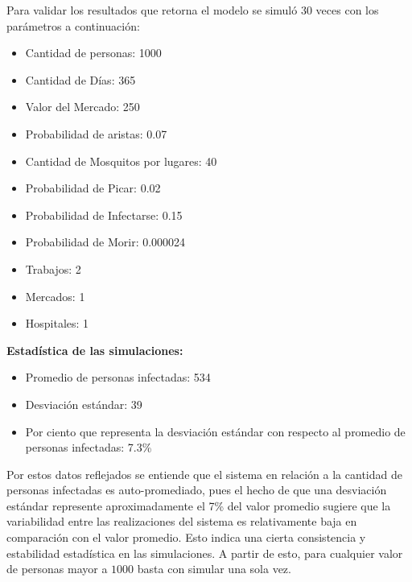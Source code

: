 Para validar los resultados que retorna el modelo se simuló $30$ veces con los parámetros a continuación:
\begin{itemize}
    \item Cantidad de personas: 1000
    \item Cantidad de Días: 365
    \item Valor del Mercado: 250
    \item Probabilidad de aristas: 0.07
    \item Cantidad de Mosquitos por lugares: 40
    \item Probabilidad de Picar: 0.02
    \item Probabilidad de Infectarse: 0.15
    \item Probabilidad de Morir: 0.000024
    \item Trabajos: 2
    \item Mercados: 1
    \item Hospitales: 1
\end{itemize}
\vspace{0.50cm}

\textbf{Estadística de las simulaciones:}
\begin{itemize}
    \item Promedio de personas infectadas: 534
    \item Desviación estándar: 39
    \item Por ciento que representa la desviación estándar con respecto al promedio de personas infectadas: 7.3\%
\end{itemize}

Por estos datos reflejados se entiende que el sistema en relación
a la cantidad de personas infectadas es auto-promediado, pues el hecho de que una desviación estándar represente aproximadamente el 7\% 
del valor promedio sugiere que la variabilidad entre las realizaciones del sistema es relativamente baja en comparación con el valor 
promedio. Esto indica una cierta consistencia y estabilidad estadística en las simulaciones. A partir de esto, para cualquier valor 
de personas mayor a $1000$ basta con simular una sola vez.\\


